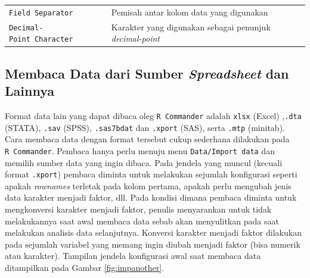 \documentclass[12pt,]{krantz}
\begin{document}
\begin{longtable}[]{@{}ll@{}}
\begin{minipage}[t]{0.21\columnwidth}\raggedright
\texttt{Field\ Separator}\strut
\end{minipage} & \begin{minipage}[t]{0.73\columnwidth}\raggedright
Pemisah antar kolom data yang digunakan\strut
\end{minipage}\tabularnewline
\begin{minipage}[t]{0.21\columnwidth}\raggedright
\texttt{Decimal-Point\ Character}\strut
\end{minipage} & \begin{minipage}[t]{0.73\columnwidth}\raggedright
Karakter yang digunakan sebagai penunjuk \emph{decimal-point}\strut
\end{minipage}\tabularnewline
\bottomrule
\end{longtable}

\hypertarget{membaca-data-dari-sumber-spreadsheet-dan-lainnya}{%
\subsection{\texorpdfstring{Membaca Data dari Sumber \emph{Spreadsheet} dan Lainnya}{Membaca Data dari Sumber Spreadsheet dan Lainnya}}\label{membaca-data-dari-sumber-spreadsheet-dan-lainnya}}

Format data lain yang dapat dibaca oleg \texttt{R\ Commander} adalah \texttt{xlsx} (Excel) ,\texttt{.dta} (STATA), \texttt{.sav} (SPSS), \texttt{.sas7bdat} dan \texttt{.xport} (SAS), serta \texttt{.mtp} (minitab). Cara membaca data dengan format tersebut cukup sederhana dilakukan pada \texttt{R\ Commander}. Pembaca hanya perlu menuju menu \texttt{Data/Import\ data} dan memilih sumber data yang ingin dibaca. Pada jendela yang muncul (kecuali format \texttt{.xport}) pembaca diminta untuk melakukan sejumlah konfigurasi seperti apakah \emph{rownames} terletak pada kolom pertama, apakah perlu mengubah jenis data karakter menjadi faktor, dll. Pada kondisi dimana pembaca diminta untuk mengkonversi karakter menjadi faktor, penulis menyarankan untuk tidak melakukannya saat awal membaca data sebab akan menyulitkan pada saat melakukan analisis data selanjutnya. Konversi karakter menjadi faktor dilakukan pada sejumlah variabel yang memang ingin diubah menjadi faktor (bisa numerik atau karakter). Tampilan jendela konfigurasi awal saat membaca data ditampilkan pada Gambar \ref{fig:impanother}.
\end{document}
